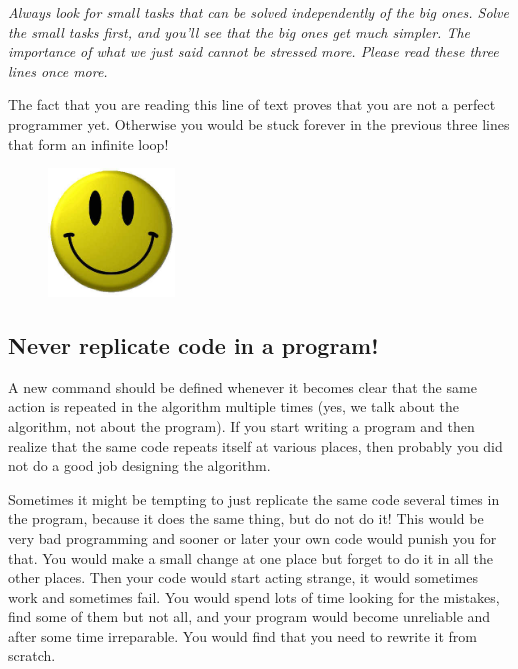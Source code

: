 \documentclass[article,A4,12pt]{llncs}
\begin{document}
{{{{{\em Always look for small tasks that can be solved independently of the big ones.
Solve the small tasks first, and you'll see that the big ones get much simpler. The 
importance of what we just said cannot be stressed more. Please read these three 
lines once more.}

\newpage
\noindent
The fact that you are reading this line of text proves that you are not 
a perfect programmer yet. Otherwise you would be stuck forever in the 
previous three lines that form an infinite loop!

\begin{figure}[!ht]
\begin{center}
\includegraphics[width=0.3\textwidth]{img/smiley.png}
\end{center}
\vspace{-1cm}
\end{figure}

\subsection{Never replicate code in a program!}

A new command should be defined whenever it becomes clear that the same 
action is repeated in the algorithm multiple times (yes, we talk about the algorithm,
not about the program). If you start writing a program and then realize that the same
code repeats itself at various places, then probably you did not do a good job 
designing the algorithm.

Sometimes it might be 
tempting to just replicate the same code several times in the 
program, because it does the same thing, but do not do it! This would be very bad programming
and sooner or later your own code would punish you for that. 
You would make a small change at one place but forget to do it 
in all the other places. Then your code would start 
acting strange, it would sometimes work and sometimes fail. 
You would spend lots of time looking for the mistakes, find some 
of them but not all, and your program would become unreliable
and after some time irreparable. You would find that you need to 
rewrite it from scratch.

}}}}
\end{document}
